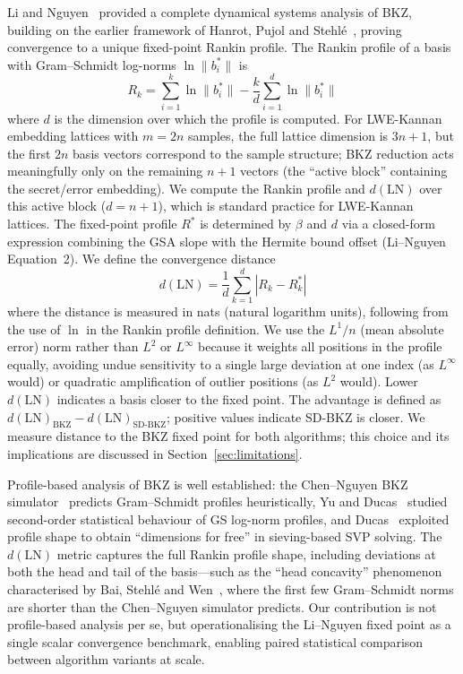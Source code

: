 \documentclass[journal=cic,version=preprint]{iacrj}
\begin{document}
Li and Nguyen~\cite{EPRINT:LiNgu20} provided a complete dynamical systems analysis of BKZ, building on the earlier framework of Hanrot, Pujol and Stehl\'{e}~\cite{C:HanPujSte11}, proving convergence to a unique fixed-point Rankin profile. The Rankin profile of a basis with Gram--Schmidt log-norms $\ln\|b^*_i\|$ is
\begin{equation}
R_k = \sum_{i=1}^{k} \ln\|b^*_i\| - \frac{k}{d} \sum_{i=1}^{d} \ln\|b^*_i\|
\end{equation}
where $d$ is the dimension over which the profile is computed. For LWE-Kannan embedding lattices with $m=2n$ samples, the full lattice dimension is $3n+1$, but the first $2n$ basis vectors correspond to the sample structure; BKZ reduction acts meaningfully only on the remaining $n+1$ vectors (the ``active block'' containing the secret/error embedding). We compute the Rankin profile and $d(\mathrm{LN})$ over this active block ($d=n+1$), which is standard practice for LWE-Kannan lattices. The fixed-point profile $R^*$ is determined by $\beta$ and $d$ via a closed-form expression combining the GSA slope with the Hermite bound offset (Li--Nguyen Equation~2). We define the convergence distance
\begin{equation}
d(\mathrm{LN}) = \frac{1}{d} \sum_{k=1}^{d} \left| R_k - R^*_k \right|
\end{equation}
where the distance is measured in nats (natural logarithm units), following from the use of $\ln$ in the Rankin profile definition. We use the $L^1/n$ (mean absolute error) norm rather than $L^2$ or $L^\infty$ because it weights all positions in the profile equally, avoiding undue sensitivity to a single large deviation at one index (as $L^\infty$ would) or quadratic amplification of outlier positions (as $L^2$ would). Lower $d(\mathrm{LN})$ indicates a basis closer to the fixed point. The advantage is defined as $d(\mathrm{LN})_{\mathrm{BKZ}} - d(\mathrm{LN})_{\mathrm{SD\text{-}BKZ}}$; positive values indicate SD-BKZ is closer. We measure distance to the BKZ fixed point for both algorithms; this choice and its implications are discussed in Section~\ref{sec:limitations}.

Profile-based analysis of BKZ is well established: the Chen--Nguyen BKZ simulator~\cite{AC:CheNgu11} predicts Gram--Schmidt profiles heuristically, Yu and Ducas~\cite{SAC:YuDuc17} studied second-order statistical behaviour of GS log-norm profiles, and Ducas~\cite{EC:Ducas18} exploited profile shape to obtain ``dimensions for free'' in sieving-based SVP solving. The $d(\mathrm{LN})$ metric captures the full Rankin profile shape, including deviations at both the head and tail of the basis---such as the ``head concavity'' phenomenon characterised by Bai, Stehl\'{e} and Wen~\cite{AC:BaiSteWen18}, where the first few Gram--Schmidt norms are shorter than the Chen--Nguyen simulator predicts. Our contribution is not profile-based analysis per se, but operationalising the Li--Nguyen fixed point as a single scalar convergence benchmark, enabling paired statistical comparison between algorithm variants at scale.
\end{document}
